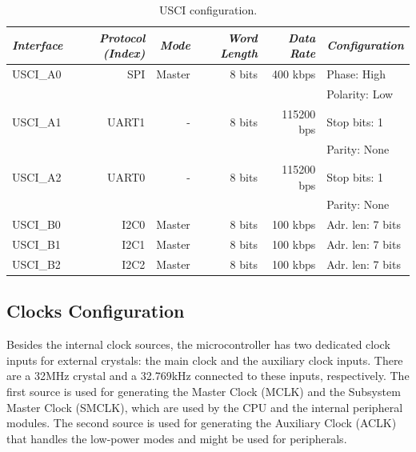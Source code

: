 \begin{table}[!h]
    \centering
    \begin{tabular}{lrrrrl}
        \toprule[1.5pt]
        \textit{Interface} & \textit{Protocol (Index)} & \textit{Mode} & \textit{Word Length} & \textit{Data Rate} & \textit{Configuration} \\
        \midrule
        USCI\_A0           & SPI                       & Master        & 8 bits               & 400 kbps           & Phase: High \\
                           &                           &               &                      &                    & Polarity: Low \\
        USCI\_A1           & UART1                     & -             & 8 bits               & 115200 bps         & Stop bits: 1 \\
                           &                           &               &                      &                    & Parity: None \\
        USCI\_A2           & UART0                     & -             & 8 bits               & 115200 bps         & Stop bits: 1 \\
                           &                           &               &                      &                    & Parity: None \\
        USCI\_B0           & I2C0                      & Master        & 8 bits               & 100 kbps           & Adr. len: 7 bits \\
        USCI\_B1           & I2C1                      & Master        & 8 bits               & 100 kbps           & Adr. len: 7 bits \\
        USCI\_B2           & I2C2                      & Master        & 8 bits               & 100 kbps           & Adr. len: 7 bits \\
        \bottomrule[1.5pt]
    \end{tabular}
    \caption{USCI configuration.}
    \label{tab:usci-config}
\end{table}

\subsection{Clocks Configuration}

Besides the internal clock sources, the microcontroller has two dedicated clock inputs for external crystals: the main clock and the auxiliary clock inputs. There are a 32MHz crystal and a 32.769kHz connected to these inputs, respectively. The first source is used for generating the Master Clock (MCLK) and the Subsystem Master Clock (SMCLK), which are used by the CPU and the internal peripheral modules. The second source is used for generating the Auxiliary Clock (ACLK) that handles the low-power modes and might be used for peripherals.

